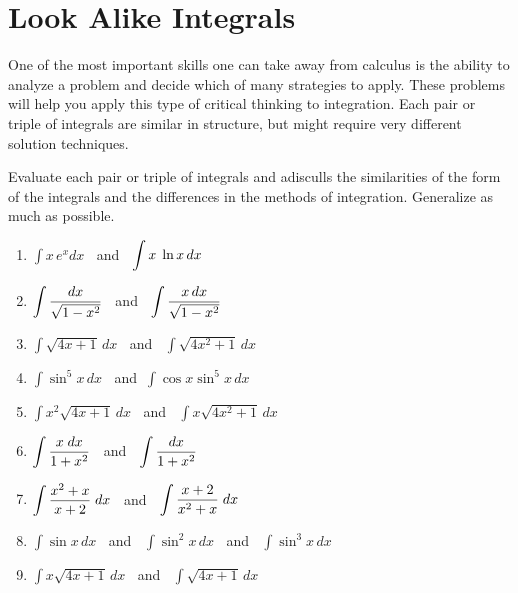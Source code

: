 \chapter{Look Alike Integrals }

One of the most important skills one can take away from calculus is the ability to analyze a problem and decide which of many strategies to apply.  These problems will help you apply this type of critical thinking to integration.  Each pair or triple of integrals are similar in structure, but might require very different solution techniques.

Evaluate each pair or triple of integrals and adisculls the similarities of the form of the integrals and the differences in the methods of integration.  Generalize as much as possible.

\begin{enumerate}
\item $\displaystyle  \int {x\,e^x dx}  $ $\ $ and $\ $ $\displaystyle  \int {x{\kern 1pt} \,\ln x\,dx}  $

\item $\displaystyle  \int {{{dx} \over {\sqrt {1 - x^2 } }}}  $ $\ $ and $\ $ $\displaystyle  \int {{{x\,dx} \over {\sqrt {1 - x^2 } }}}  $

\item  $\displaystyle  \int {\sqrt {4x + 1} \,dx}  $ $\ $ and $\ $ $\displaystyle  \int {\sqrt {4x^2  + 1} \,dx}  $

\item $\displaystyle  \int {\sin ^5 x\,dx}  $  $\ $ and $\ $$\displaystyle  \int {\cos x\sin ^5 x\,dx}  $

\item $\displaystyle  \int {x^2 \sqrt {4x + 1} \,dx}   $ $\ $ and $\ $ $\displaystyle  \int {x\sqrt {4x^2  + 1} \,dx}  $

\item $\displaystyle  \int {{{x\;dx} \over {1 + x^2 }}}  $ $\ $ and $\ $ $\displaystyle  \int {{{dx} \over {1 + x^2 }}}  $

\item $\displaystyle  \int {{{x^2  + x} \over {x + 2}}\;} dx $ $\ $ and $\ $ $\displaystyle  \int {{{x + 2} \over {x^2  + x}}} \;dx $

\item $\displaystyle  \int {\sin x\,dx}  $  $\ $ and $\ $ $\displaystyle  \int {\sin ^2 x\,dx}  $ $\ $ and $\ $ $\displaystyle  \int {\sin ^3 x\,dx}  $

\item $\displaystyle  \int {x\sqrt {4x + 1} \,dx}  $ $\ $ and $\ $ $\displaystyle  \int {\sqrt {4x + 1} \,dx}  $


\end{enumerate}
